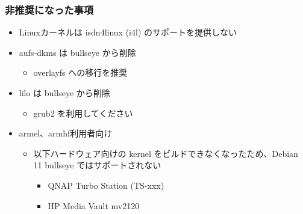 \documentclass[mingoth,a4paper]{jsarticle}
\begin{document}

\subsubsection{非推奨になった事項}

  
\begin{itemize}
\item Linuxカーネルは isdn4linux (i4l) のサポートを提供しない
\item aufs-dkms は bullseye から削除
  \begin{itemize}
  \item overlayfs への移行を推奨
  \end{itemize}    
\item lilo は bullseye から削除
  \begin{itemize}
  \item grub2 を利用してください
  \end{itemize}    
\item armel、armhf利用者向け
  \begin{itemize}
  \item 以下ハードウェア向けの kernel をビルドできなくなったため、Debian 11 bullseye ではサポートされない
    \begin{itemize}
    \item QNAP Turbo Station (TS-xxx)
    \item HP Media Vault mv2120 
    \end{itemize}
  \end{itemize}  
\end{itemize}




\end{document}
